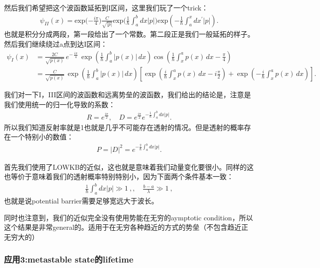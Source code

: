 然后我们希望把这个波函数延拓到I区间，这里我们玩了一个trick：
\begin{align}
  \psi_{II}(x)
  =\text{exp}{(-\frac{i\pi}{4}})\frac{C}{\sqrt{|p|}}\text{exp}{(\frac{1}{\hbar}\int_{a}^{b}dx|p|})\text{exp}({-\frac{1}{\hbar}\int_{a}^{x}dx^{\prime}|p|}).
\end{align}
也就是积分分成两段，第一段给出了一个常数。第二段正是我们一般延拓的样子。然后我们继续绕过a点到达I区间：
\begin{align}
  \psi_I(x)
  &=
  \frac{2C}{\sqrt{p(x)}}\,
  e^{-\,\frac{i\pi}{4}}\,
  \exp\!\left(\frac{1}{\hbar}\int_a^b |p(x)|\,dx\right)
  \cos\!\left(
    \frac{1}{\hbar}\int_x^a p(x)\,dx - \frac{\pi}{4}
  \right)
  \\
  &=
  \frac{C}{\sqrt{p(x)}}\,
  \exp\!\left(\frac{1}{\hbar}\int_a^b |p(x)|\,dx\right)
  \left[
    \exp\!\left(
      \frac{i}{\hbar}\int_x^a p(x)\,dx - i\frac{\pi}{2}
    \right)
    +
    \exp\!\left(
      -\frac{i}{\hbar}\int_x^a p(x)\,dx
    \right)
  \right].
\end{align}

\bigskip
{}

我们对一下I，III区间的波函数和远离势垒的波函数，我们给出的结论是，注意是我们使用统一的归一化导致的系数：
\begin{align}
  R=e^{\frac{i\pi}{2}},\quad
  D=e^{\frac{i\pi}{2}}e^{-\frac{1}{\hbar}\int_{a}^{b}dx|p|}.
\end{align}
所以我们知道反射率就是1也就是几乎不可能存在透射的情况。但是透射的概率存在一个特别小的数值：
\begin{align}
  P=|D|^2=e^{-\frac{2}{\hbar}\int_a^bdx|p|}.
\end{align}

\bigskip
{}

首先我们使用了LOWKB的近似，这也就是意味着我们动量变化要很小。同样的这也等价于意味着我们的透射概率特别特别小，因为下面两个条件基本一致：
\begin{align}
  \frac{1}{\hbar}\int_a^bdx\left|p\right|\gg 1\mathrm{~,} , \quad
  \frac{b-a}{\lambda}\gg 1\mathrm{~,}
\end{align}
也就是说potential barrier需要足够宽远大于波长。

同时也注意到，我们的近似完全没有使用势能在无穷的aymptotic
condition，所以这个结果是非常general的。适用于在无穷各种趋近的方式的势垒（不包含趋近正无穷大的）

\subsubsection{应用3:metastable state的lifetime}


